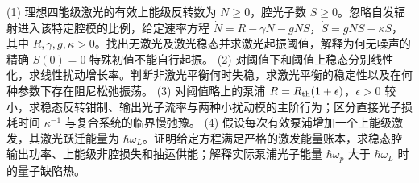 (1) 理想四能级激光的有效上能级反转数为 \(N\ge0\)，腔光子数 \(S\ge0\)。忽略自发辐射进入该特定腔模的比例，给定速率方程
\(\dot N=R-\gamma N-gNS\)，\(\dot S=gNS-\kappa S\)，其中 \(R,\gamma,g,\kappa>0\)。找出无激光及激光稳态并求激光起振阈值，解释为何无噪声的精确 \(S(0)=0\) 特殊初值不能自行起振。
(2) 对阈值下和阈值上稳态分别线性化，求线性扰动增长率。判断非激光平衡何时失稳，求激光平衡的稳定性以及在何种参数下存在阻尼松弛振荡。
(3) 对阈值略上的泵浦 \(R=R_{\rm th}(1+\epsilon)\)，\(\epsilon>0\) 较小，求稳态反转钳制、输出光子流率与两种小扰动模的主阶行为；区分直接光子损耗时间 \(\kappa^{-1}\) 与复合系统的临界慢弛豫。
(4) 假设每次有效泵浦增加一个上能级激发，其激光跃迁能量为 \(\hbar\omega_L\)。证明给定方程满足严格的激发能量账本，求稳态腔输出功率、上能级非腔损失和抽运供能；解释实际泵浦光子能量 \(\hbar\omega_p\) 大于 \(\hbar\omega_L\) 时的量子缺陷热。
